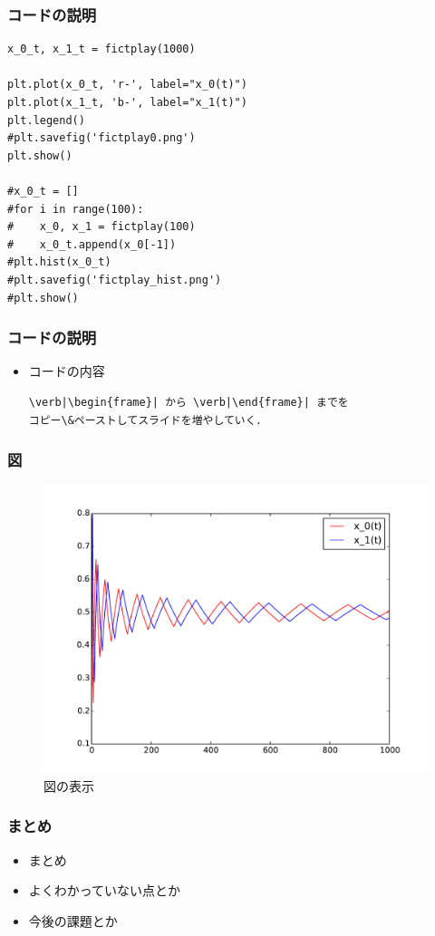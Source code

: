 \documentclass[dvipdfmx,fleqn,handout]{beamer}
\begin{document}
\begin{frame}[containsverbatim]%
\frametitle{コードの説明}

\begin{verbatim}
x_0_t, x_1_t = fictplay(1000)
         
plt.plot(x_0_t, 'r-', label="x_0(t)")
plt.plot(x_1_t, 'b-', label="x_1(t)")
plt.legend()
#plt.savefig('fictplay0.png')
plt.show()

#x_0_t = []
#for i in range(100):
#    x_0, x_1 = fictplay(100)
#    x_0_t.append(x_0[-1])
#plt.hist(x_0_t)
#plt.savefig('fictplay_hist.png')
#plt.show()
\end{verbatim}


\end{frame}

\begin{frame}[containsverbatim]%
\frametitle{コードの説明}
\begin{itemize}\setlength{\parskip}{0.5em}
\item
コードの内容
\begin{verbatim}
\verb|\begin{frame}| から \verb|\end{frame}| までを
コピー\&ペーストしてスライドを増やしていく．
\end{verbatim}

\end{itemize}
\end{frame}


\begin{frame}
\frametitle{図}
\begin{figure}
 \centering
 \includegraphics[scale=0.5]{matchingpennies_plot.pdf}
 \caption{図の表示}
 \label{fig:matchingpennies_plot}
\end{figure}
\end{frame}



\begin{frame}
\frametitle{まとめ}
\begin{itemize}\setlength{\parskip}{0.5em}
\item
まとめ

\item
よくわかっていない点とか

\item
今後の課題とか
\end{itemize}
\end{frame}
\end{document}
